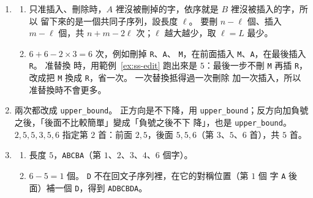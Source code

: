 \begin{enumerate}
\item
\begin{enumerate}
\item 只准插入、刪除時，$A$ 裡沒被刪掉的字，依序就是 $B$ 裡沒被插入的字，所以
留下來的是一個共同子序列，設長度 $\ell$。 要刪 $n - \ell$ 個、插入 $m - \ell$
個，共 $n + m - 2\ell$ 次；$\ell$ 越大越少，取 $\ell = L$ 最少。
\item $6 + 6 - 2 \times 3 = 6$ 次，例如刪掉 \texttt{R}、\texttt{A}、
\texttt{M}，在前面插入 \texttt{M}、\texttt{A}，在最後插入 \texttt{R}。 准替換
時，用範例~\ref{ex:ss-edit} 跑出來是 $5$：最後一步不刪 \texttt{M} 再插
\texttt{R}，改成把 \texttt{M} 換成 \texttt{R}，省一次。 一次替換抵得過一次刪除
加一次插入，所以准替換時不會更多。
\end{enumerate}

\item 兩次都改成 \texttt{upper\_bound}。 正方向是不下降，用
\texttt{upper\_bound}；反方向加負號之後，「後面不比較簡單」變成「負號之後不下
降」，也是 \texttt{upper\_bound}。 $2, 5, 5, 3, 5, 6$ 指定第 $2$ 首：前面
$2, 5$，後面 $5, 5, 6$（第 $3$、$5$、$6$ 首），共 $5$ 首。

\item
\begin{enumerate}
\item 長度 $5$，\texttt{ABCBA}（第 $1$、$2$、$3$、$4$、$6$ 個字）。
\item $6 - 5 = 1$ 個。 \texttt{D} 不在回文子序列裡，在它的對稱位置（第 $1$ 個
字 \texttt{A} 後面）補一個 \texttt{D}，得到 \texttt{ADBCBDA}。
\end{enumerate}
\end{enumerate}
